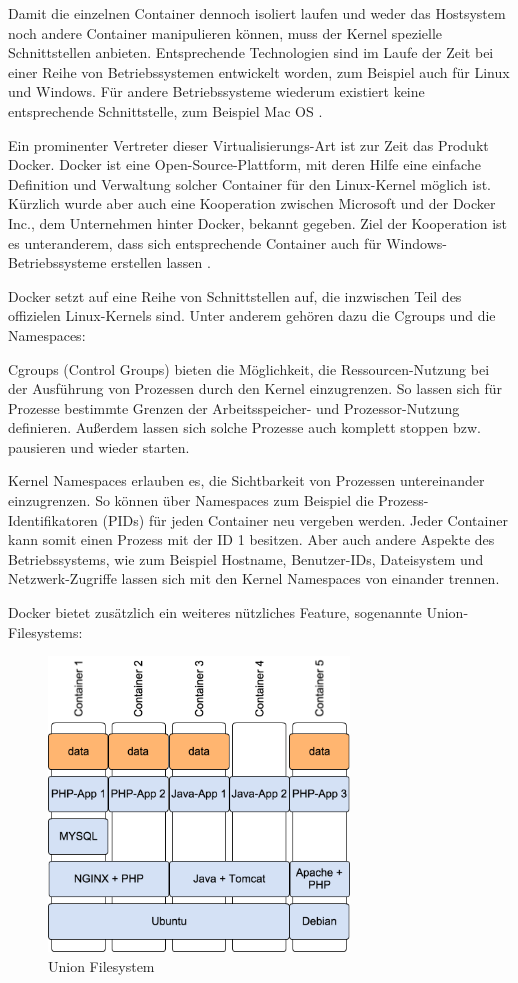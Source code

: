 Damit die einzelnen Container dennoch isoliert laufen und weder das Hostsystem noch andere Container manipulieren können, muss der Kernel spezielle Schnittstellen anbieten. Entsprechende Technologien sind im Laufe der Zeit bei einer Reihe von Betriebssystemen entwickelt worden, zum Beispiel auch für Linux und Windows. Für andere Betriebssysteme wiederum existiert keine entsprechende Schnittstelle, zum Beispiel Mac OS \citep[Vgl.][]{wiki:007}.

Ein prominenter Vertreter dieser Virtualisierungs-Art ist zur Zeit das Produkt Docker. Docker ist eine Open-Source-Plattform, mit deren Hilfe eine einfache Definition und Verwaltung solcher Container für den Linux-Kernel möglich ist. Kürzlich wurde aber auch eine Kooperation zwischen Microsoft und der Docker Inc., dem Unternehmen hinter Docker, bekannt gegeben. Ziel der Kooperation ist es unteranderem, dass sich entsprechende Container auch für Windows-Betriebssysteme erstellen lassen \citep[Vgl.][]{heise:001}.

Docker setzt auf eine Reihe von Schnittstellen auf, die inzwischen Teil des offizielen Linux-Kernels sind. Unter anderem gehören dazu die Cgroups und die Namespaces:

Cgroups (Control Groups) bieten die Möglichkeit, die Ressourcen-Nutzung bei der Ausführung von Prozessen durch den Kernel einzugrenzen. So lassen sich für Prozesse bestimmte Grenzen der Arbeitsspeicher- und Prozessor-Nutzung definieren. Außerdem lassen sich solche Prozesse auch komplett stoppen bzw. pausieren und wieder starten.

Kernel Namespaces erlauben es, die Sichtbarkeit von Prozessen untereinander einzugrenzen. So können über Namespaces zum Beispiel die Prozess-Identifikatoren (PIDs) für jeden Container neu vergeben werden. Jeder Container kann somit einen Prozess mit der ID 1 besitzen. Aber auch andere Aspekte des Betriebssystems, wie zum Beispiel Hostname, Benutzer-IDs, Dateisystem und Netzwerk-Zugriffe lassen sich mit den Kernel Namespaces von einander trennen.

Docker bietet zusätzlich ein weiteres nützliches Feature, sogenannte Union-Filesystems:

\begin{figure}[!ht]
  \begin{center}
    \includegraphics[width=8cm]{bilder/UnionFilesystem.png}
    \caption{Union Filesystem}
    \label{Union Filesystem}
  \end{center}
\end{figure}

